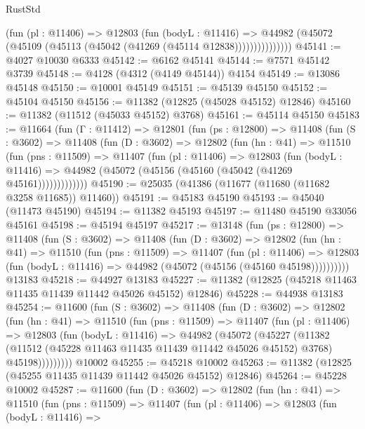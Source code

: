 \begin{lexlean}{RustStd}
\begin{coremodule}
                  (fun (pl : @11406) =>
                  @12803
                    (fun (bodyL : @11416) =>
                    @44982 (@45072 (@45109 (@45113 (@45042 (@41269 (@45114 @12838)))))))))))))))
@45141 := @4027 @10030 @6333
@45142 := @6162 @45141
@45144 := @7571 @45142 @3739
@45148 := @4128 (@4312 (@4149 @45144)) @4154
@45149 := @13086 @45148
@45150 := @10001 @45149
@45151 := @45139 @45150
@45152 := @45104 @45150
@45156 := @11382 (@12825 (@45028 @45152) @12846)
@45160 := @11382 (@11512 (@45033 @45152) @3768)
@45161 := @45114 @45150
@45183 := @11664
    (fun (Γ : @11412) =>
    @12801
      (fun (ps : @12800) =>
      @11408
        (fun (S : @3602) =>
        @11408
          (fun (D : @3602) =>
          @12802
            (fun (hn : @41) =>
            @11510
              (fun (pns : @11509) =>
              @11407
                (fun (pl : @11406) =>
                @12803
                  (fun (bodyL : @11416) =>
                  @44982 (@45072 (@45156 (@45160 (@45042 (@41269 @45161)))))))))))))
@45190 := @25035 (@41386 (@11677 (@11680 (@11682 @3258 @11685)) @11460))
@45191 := @45183 @45190
@45193 := @45040 (@11473 @45190)
@45194 := @11382 @45193
@45197 := @11480 @45190 @33056 @45161
@45198 := @45194 @45197
@45217 := @13148
    (fun (ps : @12800) =>
    @11408
      (fun (S : @3602) =>
      @11408
        (fun (D : @3602) =>
        @12802
          (fun (hn : @41) =>
          @11510
            (fun (pns : @11509) =>
            @11407
              (fun (pl : @11406) =>
              @12803 (fun (bodyL : @11416) => @44982 (@45072 (@45156 (@45160 @45198))))))))))
    @13183
@45218 := @44927 @13183
@45227 := @11382 (@12825 (@45218 @11463 @11435 @11439 @11442 @45026 @45152) @12846)
@45228 := @44938 @13183
@45254 := @11600
    (fun (S : @3602) =>
    @11408
      (fun (D : @3602) =>
      @12802
        (fun (hn : @41) =>
        @11510
          (fun (pns : @11509) =>
          @11407
            (fun (pl : @11406) =>
            @12803
              (fun (bodyL : @11416) =>
              @44982
                (@45072
                  (@45227
                    (@11382
                      (@11512 (@45228 @11463 @11435 @11439 @11442 @45026 @45152) @3768)
                      @45198)))))))))
    @10002
@45255 := @45218 @10002
@45263 := @11382 (@12825 (@45255 @11435 @11439 @11442 @45026 @45152) @12846)
@45264 := @45228 @10002
@45287 := @11600
    (fun (D : @3602) =>
    @12802
      (fun (hn : @41) =>
      @11510
        (fun (pns : @11509) =>
        @11407
          (fun (pl : @11406) =>
          @12803
            (fun (bodyL : @11416) =>

\end{coremodule}
\end{lexlean}
